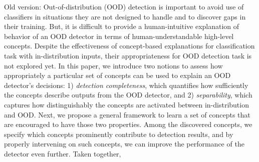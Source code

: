 
\iffalse

Old version:
Out-of-distribution (OOD) detection is important to avoid use of classifiers in situations they are not designed to handle and to discover gaps in their training. But, it is difficult to provide a human-intuitive explanation of behavior of an OOD detector in terms of human-understandable high-level concepts. 
Despite the effectiveness of concept-based explanations for classification task with in-distribution inputs, their appropriateness for OOD detection task is not explored yet.
In this paper, we introduce two notions to assess how appropriately a particular set of concepts can be used to explain an OOD detector's decisions: 1) \textit{detection completeness}, which quantifies how sufficiently the concepts describe outputs from the OOD detector, and 2) \textit{separability}, which captures how distinguishably the concepts are activated between in-distribution and OOD.
Next, we propose a general framework to learn a set of concepts that are encouraged to have those two properties.
Among the discovered concepts, we specify which concepts prominently contribute to detection results, and by properly intervening on such concepts, we can improve the performance of the detector even further.
Taken together, 



